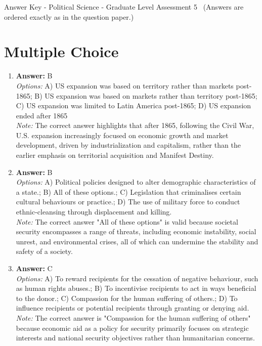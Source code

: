 \documentclass[12pt]{article}
\begin{document}
\begin{center}
Answer Key - Political Science - Graduate Level Assessment 5 \
\small (Answers are ordered exactly as in the question paper.)
\end{center}

\section*{Multiple Choice}
\begin{enumerate}[label=\arabic*.]
\item \textbf{Answer:} B
\\ \textit{Options:} A) US expansion was based on territory rather than markets post-1865; B) US expansion was based on markets rather than territory post-1865; C) US expansion was limited to Latin America post-1865; D) US expansion ended after 1865
\\ \textit{Note:} The correct answer highlights that after 1865, following the Civil War, U.S. expansion increasingly focused on economic growth and market development, driven by industrialization and capitalism, rather than the earlier emphasis on territorial acquisition and Manifest Destiny.
\item \textbf{Answer:} B
\\ \textit{Options:} A) Political policies designed to alter demographic characteristics of a state.; B) All of these options.; C) Legislation that criminalises certain cultural behaviours or practice.; D) The use of military force to conduct ethnic-cleansing through displacement and killing.
\\ \textit{Note:} The correct answer "All of these options" is valid because societal security encompasses a range of threats, including economic instability, social unrest, and environmental crises, all of which can undermine the stability and safety of a society.
\item \textbf{Answer:} C
\\ \textit{Options:} A) To reward recipients for the cessation of negative behaviour, such as human rights abuses.; B) To incentivise recipients to act in ways beneficial to the donor.; C) Compassion for the human suffering of others.; D) To influence recipients or potential recipients through granting or denying aid.
\\ \textit{Note:} The correct answer is "Compassion for the human suffering of others" because economic aid as a policy for security primarily focuses on strategic interests and national security objectives rather than humanitarian concerns.

\end{enumerate}
\end{document}
